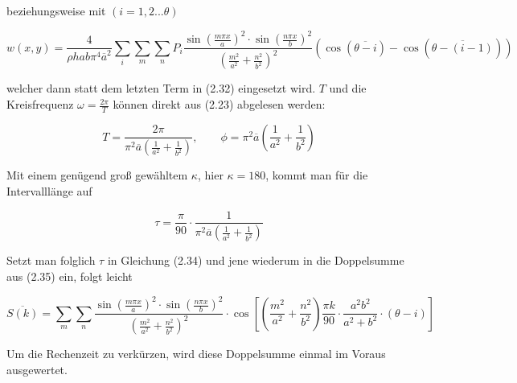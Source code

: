 beziehungsweise mit $(i=1,2 ... \theta)$ 

\begin{equation}
 	w(x,y) = \frac{4}{\rho h a b \pi^4 \overline{a}^2} \sum_i \sum_m \sum_n P_{i} \frac{\sin \left( \frac{m \pi x}{a} \right)^2 \cdot \sin \left( \frac{n \pi x}{b} \right)^2}{ \left( \frac{m^2}{a^2} + \frac{n^2}{b^2} \right)^2} \left( \cos(\overline{\theta - i}) - \cos(\overline{\theta - (i-1)}) \right)
\end{equation}

welcher dann statt dem letzten Term in (2.32) eingesetzt wird. $T$ und die Kreisfrequenz $\omega = \frac{2 \pi}{T}$ können direkt aus (2.23) abgelesen werden: 

\begin{equation}
	T = \frac{2 \pi}{\pi^2 \overline{a} \left( \frac{1}{a^2} + \frac{1}{b^2} \right) }, \qquad \phi=\pi^2 \overline{a} \left( \frac{1}{a^2}+\frac{1}{b^2} \right)
\end{equation}

Mit einem genügend groß gewähltem $\kappa$, hier $\kappa=180$, kommt man für die Intervalllänge auf

\begin{equation}
	\tau = \frac{\pi}{90} \cdot \frac{1}{\pi^2 \overline{a} \left( \frac{1}{a^2} + \frac{1}{b^2} \right) }
\end{equation}

Setzt man folglich $\tau$ in Gleichung (2.34) und jene wiederum in die Doppelsumme aus (2.35) ein, folgt leicht

\begin{equation}
	\overline{S(k)} = \sum_m \sum_n \frac{\sin \left( \frac{m \pi x}{a} \right)^2 \cdot \sin \left( \frac{n \pi x}{b} \right)^2}{ \left( \frac{m^2}{a^2} + \frac{n^2}{b^2} \right)^2} \cdot \cos \left[ \left( \frac{m^2}{a^2}+\frac{n^2}{b^2} \right) \frac{\pi k}{90} \cdot \frac{a^{2}b^{2}}{a^{2}+b^{2}} \cdot (\theta - i)  \right] 
\end{equation}

Um die Rechenzeit zu verkürzen, wird diese Doppelsumme einmal im Voraus ausgewertet.

